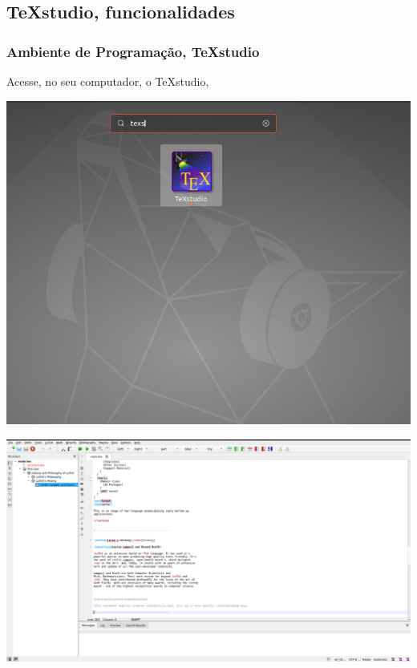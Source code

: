 \documentclass{beamer}
\begin{document}
\begin{frame}

  \section{TeXstudio, funcionalidades}
  \frametitle{Ambiente de Programação, TeXstudio}
  Acesse, no seu computador, o TeXstudio,
  \begin{center}
    \includegraphics[scale=0.10]{../Imagens/Am1.png}
  \end{center}

  \pause

  \begin{center}
    \includegraphics[scale=0.13]{../Imagens/Am2.png}
  \end{center}


\end{frame}
\end{document}
